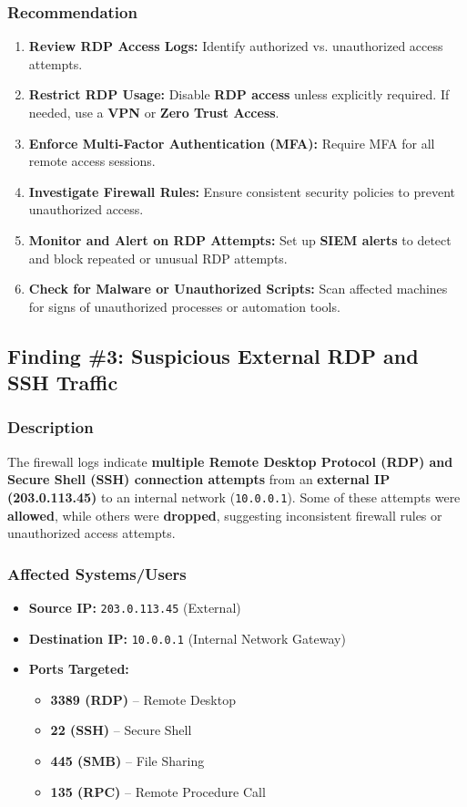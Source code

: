 \documentclass[11pt]{article}
\begin{document}
\subsubsection{Recommendation}
\begin{enumerate}
    \item \textbf{Review RDP Access Logs:} Identify authorized vs. unauthorized access attempts.
    \item \textbf{Restrict RDP Usage:} Disable \textbf{RDP access} unless explicitly required. If needed, use a \textbf{VPN} or \textbf{Zero Trust Access}.
    \item \textbf{Enforce Multi-Factor Authentication (MFA):} Require MFA for all remote access sessions.
    \item \textbf{Investigate Firewall Rules:} Ensure consistent security policies to prevent unauthorized access.
    \item \textbf{Monitor and Alert on RDP Attempts:} Set up \textbf{SIEM alerts} to detect and block repeated or unusual RDP attempts.
    \item \textbf{Check for Malware or Unauthorized Scripts:} Scan affected machines for signs of unauthorized processes or automation tools.
\end{enumerate}

\subsection{Finding \#3: Suspicious External RDP and SSH Traffic}

\subsubsection{Description}
The firewall logs indicate \textbf{multiple Remote Desktop Protocol (RDP) and Secure Shell (SSH) connection attempts} from an \textbf{external IP (203.0.113.45)} to an internal network (\texttt{10.0.0.1}). Some of these attempts were \textbf{allowed}, while others were \textbf{dropped}, suggesting inconsistent firewall rules or unauthorized access attempts.

\subsubsection{Affected Systems/Users}
\begin{itemize}
    \item \textbf{Source IP:} \texttt{203.0.113.45} (External)
    \item \textbf{Destination IP:} \texttt{10.0.0.1} (Internal Network Gateway)
    \item \textbf{Ports Targeted:}
    \begin{itemize}
        \item \textbf{3389 (RDP)} – Remote Desktop
        \item \textbf{22 (SSH)} – Secure Shell
        \item \textbf{445 (SMB)} – File Sharing
        \item \textbf{135 (RPC)} – Remote Procedure Call
    \end{itemize}
\end{itemize}
\end{document}
